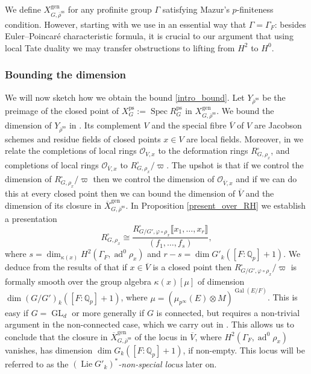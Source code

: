 \documentclass{amsart}
\theoremstyle{definition}
\theoremstyle{remark}
\DeclareMathOperator{\GL}{GL}
\DeclareMathOperator{\Gal}{Gal}
\DeclareMathOperator{\Spec}{Spec}
\newcommand{\Qp}{\mathbb {Q}_p}
\newcommand{\Vbar}{\overline{{V}}}
\newcommand{\OO}{\mathcal O}
\DeclareMathOperator{\ad}{ad}
\newcommand{\br}[1]{\llbracket #1\rrbracket}
\newcommand{\rhobar}{\overline{\rho}}
\newcommand{\ps}{\mathrm{ps}}
\newcommand{\gen}{\mathrm{gen}}
\newcommand{\Xbar}{\overline{X}}
\DeclareMathOperator{\Lie}{Lie}
\newcommand{\rhobarss}{\rhobar^{\mathrm{ss}}}
\newcommand{\git}{\mathrm{git}}
\begin{document}

We define $X^{\gen}_{G, \rhobarss}$ for any profinite group $\Gamma$ satisfying Mazur's $p$-finiteness condition. However, starting with  we use in an essential way that $\Gamma=\Gamma_F$:
besides Euler--Poincar\'e characteristic formula, it is crucial to our 
argument that using local Tate duality we may transfer obstructions 
to lifting from $H^2$ to $H^0$. 

\subsubsection{Bounding the dimension}\label{sec_intro_bd_dim} We will now sketch how we 
obtain the bound \eqref{intro_bound}. Let $Y_{\rhobarss}$ be the preimage 
of the closed point of $X^{\ps}_G:= \Spec R^{\ps}_G$ in $X^{\gen}_{G, \rhobarss}$. 
We bound the dimension of  $Y_{\rhobarss}$ in  . Its complement 
$V$ and the special fibre $\Vbar$ of $V$ are Jacobson schemes and residue fields of closed points $x\in V$ are local fields.
Moreover, in   we  relate the completions of local rings $\OO_{V, x}$ to the deformation rings 
$R^{\square}_{G, \rho_x}$, and completions of local rings $\OO_{\Vbar, x}$ to $R^{\square}_{G, \rho_x}/\varpi$.
The upshot is that if we control the dimension of  $R^{\square}_{G, \rho_x}/\varpi$ then we 
control the dimension of $\OO_{\Vbar,x}$ and if we can do this at every closed point then we can bound the dimension of 
$\Vbar$ and the dimension of its closure in $\Xbar^{\gen}_{G, \rhobarss}$. In Proposition \ref{present_over_RH} we establish a presentation 
\begin{equation}\label{intro_present}
R^{\square}_{G, \rho_x}\cong \frac{R^{\square}_{G/G', \varphi\circ \rho_x}\br{x_1, \ldots, x_r}}{(f_1,\ldots, f_s)},
\end{equation}
where $s=\dim_{\kappa(x)} H^2(\Gamma_F, \ad^0 \rho_x)$ and $r-s= \dim G'_k ([F:\Qp]+1)$. We deduce from the results of 
\cite{defT} that if $x\in \Vbar$ is a closed point then 
$R^{\square}_{G/G', \varphi\circ \rho_x}/\varpi$ 
is formally smooth over the group algebra $\kappa(x)[\mu]$ of dimension 
$\dim (G/G')_k ([F:\Qp]+1)$, where $\mu=(\mu_{p^{\infty}}(E)\otimes M)^{\Gal(E/F)}$.  
This is easy if $G=\GL_d$ or more generally if $G$ is connected, but requires a non-trivial argument in the non-connected 
case, which we carry out in \cite{defT}. This allows us to conclude that the closure in $\Xbar^{\gen}_{G, \rhobarss}$ of the locus in $\Vbar$, where 
$H^2(\Gamma_F, \ad^0\rho_x)$ vanishes, has dimension $\dim G_k([F:\Qp]+1)$, 
if non-empty. This locus will be referred to as the  $(\Lie G'_k)^*$\emph{-non-special locus} later on. 
\end{document}
